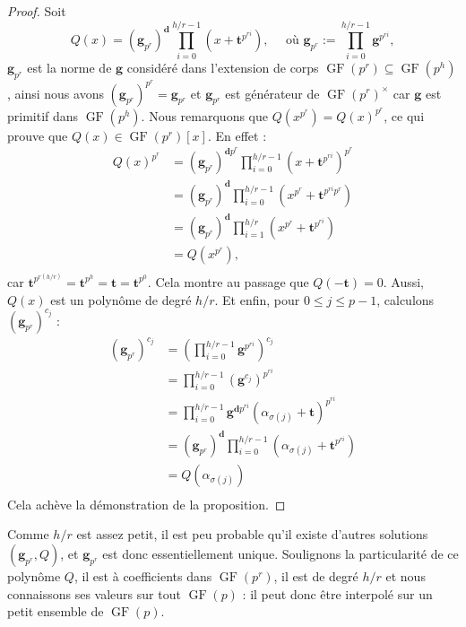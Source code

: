 \documentclass[a4paper, titlepage, 11pt]{article}
\theoremstyle{definition}
\theoremstyle{remark}
\def\gf{\operatorname{GF}}
\def\mbf#1{\mathbf{#1}}
\begin{document}
\begin{proof}
Soit 
$$Q(x) = (\mbf g_{p^r})^{\mbf d} \prod_{i=0}^{h/r-1} \left(x+\mbf t^{p^{ri}}\right),
\quad \text{ où } \mbf g_{p^r} := \prod_{i=0}^{h/r-1} \mbf g^{p^{ri}},$$
$\mbf g_{p^r}$ est la norme de $\mbf g$ considéré dans l'extension de corps $\gf(p^r) \subseteq \gf(p^h)$, ainsi nous avons $(\mbf g_{p^r})^{p^r} = \mbf g_{p^r}$ et $\mbf g_{p^r}$ est générateur de $\gf(p^r)^\times$ car $\mbf g$ est primitif dans $\gf(p^h)$. Nous remarquons que $Q\left(x^{p^r}\right) = Q(x)^{p^r}$, ce qui prouve que $Q(x) \in \gf(p^r)[x]$. En effet :
\begin{align*}
Q\left(x\right)^{p^r} &= (\mbf g_{p^r})^{\mbf dp^r} \prod_{i=0}^{h/r-1} \left(x+\mbf t^{p^{ri}}\right)^{p^r} \\
&= (\mbf g_{p^r})^{\mbf d} \prod_{i=0}^{h/r-1} \left(x^{p^r} + \mbf t^{p^{ri}p^r}\right) \\
&= (\mbf g_{p^r})^{\mbf d} \prod_{i=1}^{h/r} \left(x^{p^r} + \mbf t^{p^{ri}}\right) \\
&= Q\left(x^{p^r}\right), \\
\end{align*}
car $\mbf t^{p^{r(h/r)}} = \mbf t^{p^h} = \mbf t = \mbf t^{p^0}$. Cela montre au passage que $Q(-\mbf t) = 0$. Aussi, $Q(x)$ est un polynôme de degré $h/r$. Et enfin, pour $0\leqslant j \leqslant p-1$, calculons $(\mbf g_{p^r})^{c_j}$ :
\begin{align*}
(\mbf g_{p^r})^{c_j} &= \left(\prod_{i=0}^{h/r-1} \mbf g^{p^{ri}}\right)^{c_j}\\
&= \prod_{i=0}^{h/r-1} \left(\mbf g^{c_j}\right)^{p^{ri}}\\
&= \prod_{i=0}^{h/r-1} \mbf g^{\mbf dp^{ri}}\left(\alpha_{\sigma(j)} + \mbf t\right)^{p^{ri}}\\
&= (\mbf g_{p^r})^{\mbf d} \prod_{i=0}^{h/r-1} \left(\alpha_{\sigma(j)} + \mbf t^{p^{ri}}\right)\\
&= Q\left(\alpha_{\sigma(j)}\right) \\
\end{align*}
Cela achève la démonstration de la proposition.
\end{proof}

Comme $h/r$ est assez petit, il est peu probable qu'il existe d'autres solutions $(\mbf g_{p^r}, Q)$, et $\mbf g_{p^r}$ est donc essentiellement unique. Soulignons la particularité de ce polynôme $Q$, il est à coefficients dans $\gf(p^r)$, il est de degré $h/r$ et nous connaissons ses valeurs sur tout $\gf(p)$ : il peut donc être interpolé sur un petit ensemble de $\gf(p)$.
\end{document}

